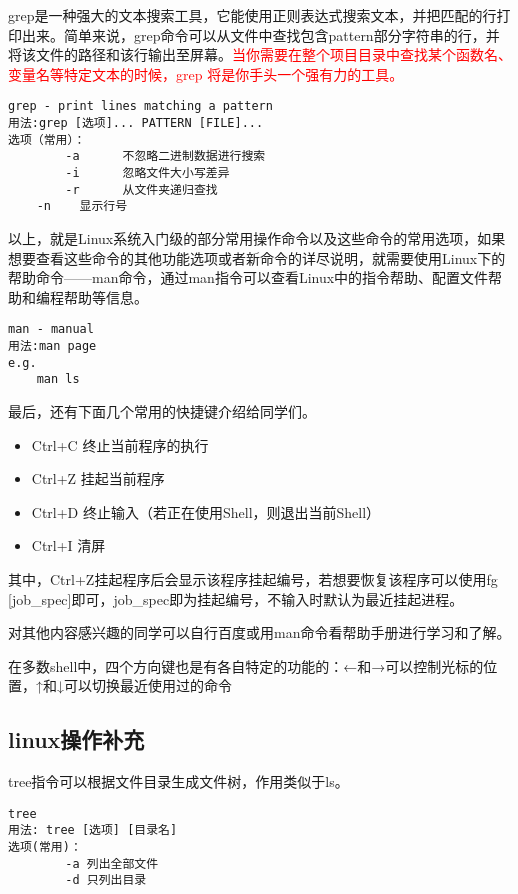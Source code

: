grep是一种强大的文本搜索工具，它能使用正则表达式搜索文本，并把匹配的行打印出来。简单来说，grep命令可以从文件中查找包含pattern部分字符串的行，并将该文件的路径和该行输出至屏幕。\textcolor{red}{当你需要在整个项目目录中查找某个函数名、变量名等特定文本的时候，grep 将是你手头一个强有力的工具。}

\begin{verbatim}
grep - print lines matching a pattern
用法:grep [选项]... PATTERN [FILE]...
选项（常用）：
		-a		不忽略二进制数据进行搜索
		-i		忽略文件大小写差异
		-r		从文件夹递归查找
    -n    显示行号
\end{verbatim}

以上，就是Linux系统入门级的部分常用操作命令以及这些命令的常用选项，如果想要查看这些命令的其他功能选项或者新命令的详尽说明，就需要使用Linux下的帮助命令——man命令，通过man指令可以查看Linux中的指令帮助、配置文件帮助和编程帮助等信息。

\begin{verbatim}
man - manual
用法:man page
e.g.
	man ls
\end{verbatim}

最后，还有下面几个常用的快捷键介绍给同学们。
\begin{itemize}
    \item Ctrl+C	终止当前程序的执行
	\item Ctrl+Z	挂起当前程序
	\item Ctrl+D	终止输入（若正在使用Shell，则退出当前Shell）
	\item Ctrl+I	清屏
\end{itemize}

其中，Ctrl+Z挂起程序后会显示该程序挂起编号，若想要恢复该程序可以使用fg [job\_spec]即可，job\_spec即为挂起编号，不输入时默认为最近挂起进程。

对其他内容感兴趣的同学可以自行百度或用man命令看帮助手册进行学习和了解。

\begin{note}
在多数shell中，四个方向键也是有各自特定的功能的：←和→可以控制光标的位置，↑和↓可以切换最近使用过的命令
\end{note}


\subsection{linux操作补充}
tree指令可以根据文件目录生成文件树，作用类似于ls。
\begin{verbatim}
tree
用法: tree [选项] [目录名]
选项(常用)：
        -a 列出全部文件
        -d 只列出目录
\end{verbatim}

